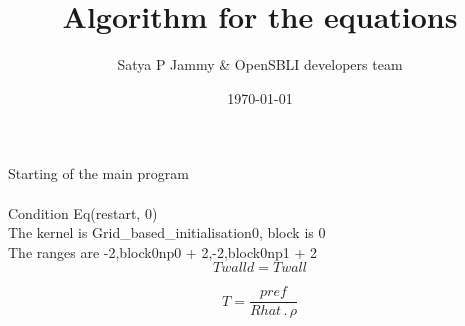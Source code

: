 \documentclass{article}
\title{Algorithm for the equations}
\author{Satya P Jammy \& OpenSBLI developers team}
\date{\today}
\begin{document}
\maketitle
\noindent Starting of the main program\\
\\\noindent Condition Eq(restart, 0)\\\noindent The kernel is Grid_based_initialisation0, block is 0\\\noindent The ranges are -2,block0np0 + 2,-2,block0np1 + 2\\\begin{dmath}Twalld = Twall\end{dmath}

\begin{dmath}T = \frac{pref}{Rhat \,.\, \rho}\end{dmath}
\end{document}
